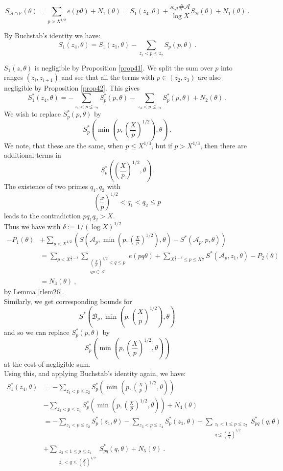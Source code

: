 \documentclass{amsart}
\numberwithin{equation}{subsection}
\begin{document}
$$S_{\mathcal{A}\cap\mathbb{P}}(\theta)=\sum_{p>X^{1/2}}e(p\theta)+N_1(\theta)=S_1(z_4, \theta)+\frac{\kappa_{\mathcal{A}}\#\mathcal{A}}{\log X}S_{\mathcal{B}}(\theta)+N_1(\theta)\:.$$

By Buchstab's identity we have:
$$S_1(z_4, \theta)=S_1(z_1, \theta)-\sum_{z_1<p\leq z_2} S_p(p, \theta)\:.$$

$S_1(z, \theta)$ is negligible by Proposition \ref{prop41}. We split the sum over $p$ into ranges $(z_i, z_{i+1})$ and see that all the terms with $p\in (z_2, z_3)$ are also negligible by Proposition \ref{prop42}. This gives
$$S_1^*(z_4, \theta)=-\sum_{z_1<p\leq z_2} S_p^*(p,\theta)-\sum_{z_3<p\leq z_4} S_p^*(p,\theta)+N_2(\theta)\:.$$
We wish to replace $S_p^*(p,\theta)$ by 
$$S_p^*\left(\min\left(p, \left(\frac{X}{p}\right)^{1/2}\right), \theta\right)\:.$$
We note, that these are the same, when $p\leq X^{1/3}$, but if $p>X^{1/3}$, then there are additional terms in 
$$S_p^*\left(\left(\frac{X}{p}\right)^{1/2}, \theta\right).$$
The existence of two primes $q_1, q_2$ with 
$$\left(\frac{x}{p}\right)^{1/2}<q_1<q_2\leq p$$
leads to the contradiction $pq_1q_2>X$.\\
Thus we have with $\delta:=1/(\log X)^{1/2}$
\begin{align*}
-P_1(\theta)&+\sum_{p<X^{1/2}}\left(S\left(\mathcal{A}_p, \min\left(p, \left(\frac{X}{p}\right)^{1/2}\right), \theta\right)-S^*(\mathcal{A}_p, p, \theta)\right)\\
&=\sum_{p< X^{\frac{1}{2}-\delta}}\sum_{\substack{\left(\frac{X}{p}\right)^{1/2}<q\leq p \\ qp\in \mathcal{A}}} e(pq\theta)+\sum_{X^{\frac{1}{2}-\delta}\leq p\leq X^{\frac{1}{2}}} S^*(\mathcal{A}_p, z_1, \theta)-P_2(\theta)\\
&=N_3(\theta)\:,  \tag{4.1}
\end{align*}
by Lemma \ref{rlem26}.\\
Similarly, we get corresponding bounds for 
$$S^*\left(\mathcal{B}_p, \min\left(p, \left(\frac{X}{p}\right)^{1/2}\right),\theta\right)$$
and so we can replace $S^*_p(p, \theta)$ by 
$$S_p^*\left(\min\left(p, \left(\frac{X}{p}\right)^{1/2}, \theta\right)\right)$$
at the cost of  negligible sum.\\
Using this, and applying Buchstab's identity again, we have:
\begin{align*}
S_1^*(z_4, \theta)&=-\sum_{z_1<p\leq z_2} S_p^*\left(\min\left(p, \left(\frac{X}{p}\right)^{1/2}, \theta\right)\right)\\
&-\sum_{z_3<p\leq z_4}S_p^*\left(\min\left(p, \left(\frac{X}{p}\right)^{1/2}, \theta\right)\right) +N_4(\theta)\\
&=-\sum_{z_1<p\leq z_2} S_p^*(z_1, \theta)-\sum_{z_3<p\leq z_4} S_p^*(z_1, \theta) + \sum_{\substack{z_1<1\leq p\leq z_2 \\ q\leq \left(\frac{X}{q}\right)^{1/2}}}S_{pq}^*(q, \theta)\\
&+\sum_{\substack{z_3<1\leq p\leq z_4 \\ z_1<q\leq \left(\frac{X}{q}\right)^{1/2}}}S_{pq}^*(q, \theta)+N_5(\theta)\:.
\end{align*}
\end{document}
